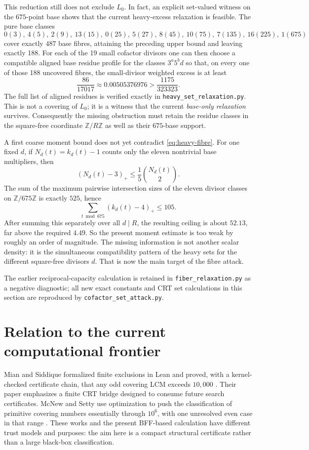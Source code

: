 \documentclass[11pt]{article}
\theoremstyle{definition}
\newcommand{\Z}{\mathbb Z}
\begin{document}
This reduction still does not exclude $L_0$.  In fact, an explicit set-valued witness on the
$675$-point base shows that the current heavy-excess relaxation is feasible.  The pure base
classes
\[
0(3),\ 4(5),\ 2(9),\ 13(15),\ 0(25),\ 5(27),\ 8(45),\ 10(75),\
7(135),\ 16(225),\ 1(675)
\]
cover exactly $487$ base fibres, attaining the preceding upper bound and leaving exactly 188.
For each of the 19 small cofactor divisors one can then choose a compatible aligned base residue
profile for the classes $3^a5^b d$ so that, on every one of those 188 uncovered fibres, the
small-divisor weighted excess is at least
\[
 \frac{86}{17017}\approx0.00505376976
 >\frac{1175}{323323}.
\]
The full list of aligned residues is verified exactly in
\texttt{heavy\_set\_relaxation.py}.  This is not a covering of $L_0$; it is a witness that the
current \emph{base-only relaxation} survives.  Consequently the missing obstruction must retain
the residue classes in the square-free coordinate $\Z/R\Z$ as well as their $675$-base support.

A first coarse moment bound does not yet contradict \eqref{eq:heavy-fibre}.  For one fixed
$d$, if $N_d(t)=k_d(t)-1$ counts only the eleven nontrivial base multipliers, then
\[
 (N_d(t)-3)_+\le \frac15\binom{N_d(t)}2.
\]
The sum of the maximum pairwise intersection sizes of the eleven divisor classes on
$\Z/675\Z$ is exactly $525$, hence
\[
 \sum_{t\bmod675}(k_d(t)-4)_+\le105.
\]
After summing this separately over all $d\mid R$, the resulting ceiling is about $52.13$, far
above the required $4.49$.  So the present moment estimate is too weak by roughly an order of
magnitude.  The missing information is not another scalar density: it is the simultaneous
compatibility pattern of the heavy sets for the different square-free divisors $d$.  That is now
the main target of the fibre attack.

The earlier reciprocal-capacity calculation is retained in \texttt{fiber\_relaxation.py} as a
negative diagnostic; all new exact constants and CRT set calculations in this section are
reproduced by \texttt{cofactor\_set\_attack.py}.

\section{Relation to the current computational frontier}

Mian and Siddique formalized finite exclusions in Lean and proved, with a kernel-checked
certificate chain, that any odd covering LCM exceeds $10{,}000$ \cite{MianSiddique2026}.  Their
paper emphasizes a finite CRT bridge designed to consume future search certificates.  McNew and
Setty use optimization to push the classification of primitive covering numbers essentially
through $10^6$, with one unresolved even case in that range \cite{McNewSetty2026}.  These works
and the present BFF-based calculation have different trust models and purposes: the aim here is
a compact structural certificate rather than a large black-box classification.
\end{document}
